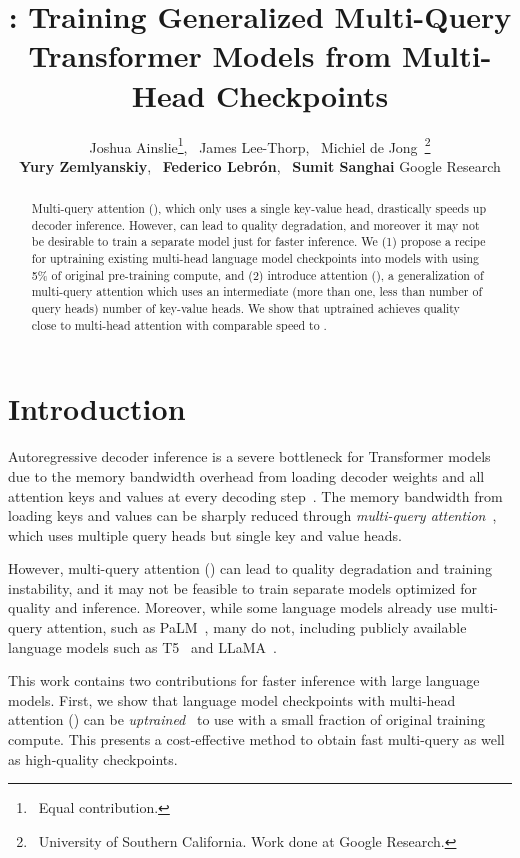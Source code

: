 \documentclass[11pt]{article}
\title{\gmq: Training Generalized Multi-Query Transformer Models from Multi-Head Checkpoints}
\author{
Joshua Ainslie\thanks{\- \ Equal contribution.},~ James Lee-Thorp\footnotemark[1],~ Michiel de Jong\footnotemark[1] \ \footnotemark[2]\thanks{\- \ University of Southern California. Work done at Google Research.} \\ 
{\bf Yury Zemlyanskiy},~ {\bf Federico Lebr\'{o}n},~ {\bf Sumit Sanghai}
  \AND
  {\rm \Large Google Research}\\
  }
\begin{document}
\maketitle
\begin{abstract}
Multi-query attention (\mq), which only uses a single key-value head, drastically speeds up decoder inference. However, \mq can lead to quality degradation, and moreover it may not be desirable to train a separate model just for faster inference. We (1) propose a recipe for uptraining existing multi-head language model checkpoints into models with \mq using 5\% of original pre-training compute, and (2) introduce \fullgmq attention (\gmq), a generalization of multi-query attention which uses an intermediate (more than one, less than number of query heads) number of key-value heads. We show that uptrained \gmq achieves quality close to multi-head attention with comparable speed to \mq.

\end{abstract}

\section{Introduction}
\label{section:intro}

Autoregressive decoder inference is a severe bottleneck for Transformer models due to the memory bandwidth overhead from loading decoder weights and all attention keys and values at every decoding step~\citep{shazeer2019mq, palminference, dejong2022fido}. The memory bandwidth from loading keys and values can be sharply reduced through \emph{multi-query attention}~\citep{shazeer2019mq}, which uses multiple query heads but single key and value heads.

However, multi-query attention (\mq) can lead to quality degradation and training instability, and it may not be feasible to train separate models optimized for quality and inference. Moreover, while some language models already use multi-query attention, such as PaLM~\citep{palm}, many do not, including publicly available language models such as T5~\citep{t5} and LLaMA~\citep{llama}. 

This work contains two contributions for faster inference with large language models. First, we show that language model checkpoints with multi-head attention (\mh) can be \emph{uptrained}~\citep{sparsemoe} to use \mq with a small fraction of original training compute. This presents a cost-effective method to obtain fast multi-query as well as high-quality \mh checkpoints.
\end{document}
